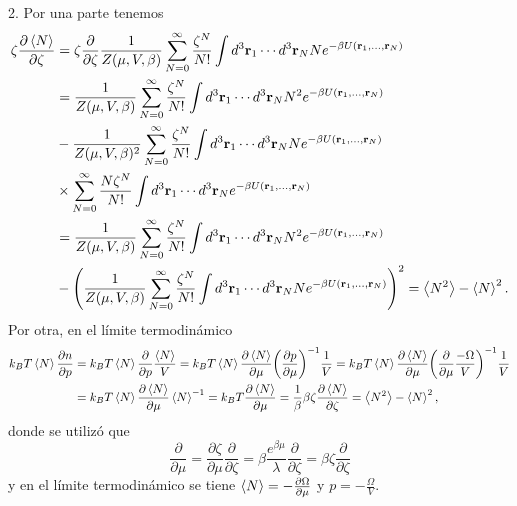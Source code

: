 \documentclass{article}
\begin{document}
2. Por una parte tenemos
\begin{align}
\begin{split}
\zeta\frac{\partial\ev{N}}{\partial\zeta}&=\zeta\frac{\partial}{\partial\zeta}\frac{1}{Z(\mu,V,\beta)}\sum_{N=0}^\infty\frac{\zeta^N}{N!}\int d^3\vb{r}_1\cdots d^3\vb{r}_N N e^{-\beta U(\vb{r}_1,\dots,\vb{r}_N)}\\
&=\frac{1}{Z(\mu,V,\beta)}\sum_{N=0}^\infty\frac{\zeta^N}{N!}\int d^3\vb{r}_1\cdots d^3\vb{r}_N N^2 e^{-\beta U(\vb{r}_1,\dots,\vb{r}_N)}\\
&-\frac{1}{Z(\mu,V,\beta)^2}\sum_{N=0}^\infty\frac{\zeta^N}{N!}\int d^3\vb{r}_1\cdots d^3\vb{r}_N N e^{-\beta U(\vb{r}_1,\dots,\vb{r}_N)}\\
&\times\sum_{N=0}^\infty\frac{N\zeta^N}{N!}\int d^3\vb{r}_1\cdots d^3\vb{r}_N e^{-\beta U(\vb{r}_1,\dots,\vb{r}_N)}\\
&=\frac{1}{Z(\mu,V,\beta)}\sum_{N=0}^\infty\frac{\zeta^N}{N!}\int d^3\vb{r}_1\cdots d^3\vb{r}_N N^2 e^{-\beta U(\vb{r}_1,\dots,\vb{r}_N)}\\
&-\qty(\frac{1}{Z(\mu,V,\beta)}\sum_{N=0}^\infty\frac{\zeta^N}{N!}\int d^3\vb{r}_1\cdots d^3\vb{r}_N N e^{-\beta U(\vb{r}_1,\dots,\vb{r}_N)})^2=\ev{N^2}-\ev{N}^2.
\end{split}
\end{align}
Por otra, en el límite termodinámico
\begin{align}
\begin{split}
k_BT\ev{N}\frac{\partial n}{\partial p}&=k_BT\ev{N}\frac{\partial}{\partial p}\frac{\ev{N}}{V}=k_BT\ev{N}\frac{\partial \ev{N}}{\partial\mu}\qty(\frac{\partial p}{\partial \mu})^{-1}\frac{1}{V}=k_BT\ev{N}\frac{\partial \ev{N}}{\partial\mu}\qty(\frac{\partial}{\partial\mu}\frac{-\Omega}{V})^{-1}\frac{1}{V}\\
&=k_BT\ev{N}\frac{\partial \ev{N}}{\partial\mu}\ev{N}^{-1}=k_BT\frac{\partial \ev{N}}{\partial\mu}=\frac{1}{\beta}\beta\zeta\frac{\partial \ev{N}}{\partial\zeta}=\ev{N^2}-\ev{N}^2,
\end{split}
\end{align}
donde se utilizó que 
\begin{equation}
\frac{\partial}{\partial \mu}=\frac{\partial\zeta}{\partial\mu}\frac{\partial}{\partial\zeta}=\beta\frac{e^{\beta\mu}}{\lambda}\frac{\partial}{\partial\zeta}=\beta\zeta\frac{\partial}{\partial\zeta}
\end{equation}
y en el límite termodinámico se tiene $\ev{N}=-\frac{\partial\Omega}{\partial\mu}$ y $p=-\frac{\Omega}{V}$.
\end{document}
